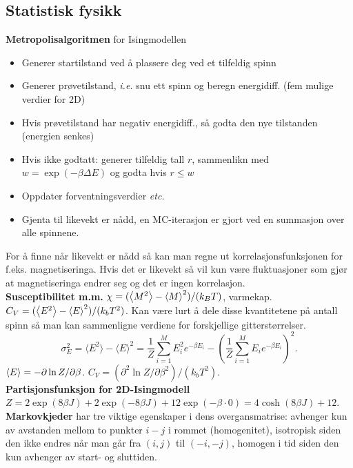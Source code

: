 \documentclass[12pt,a4paper,twocolumn]{article}
\begin{document}
\begin{flushleft}
\subsection{Statistisk fysikk} %
\label{sub:statistisk_fysikk}
\textbf{Metropolisalgoritmen} for Isingmodellen
\begin{itemize}
  \item Generer startilstand ved å plassere deg ved et tilfeldig spinn
  \item Generer prøvetilstand, \emph{i.e.} snu ett spinn og beregn energidiff. (fem mulige verdier for 2D)
  \item Hvis prøvetilstand har negativ energidiff., så godta den nye tilstanden (energien senkes)
  \item Hvis ikke godtatt: generer tilfeldig tall $r$, sammenlikn med $w=\exp(-\beta\Delta E)$ og godta hvis $r\leq w$
  \item Oppdater forventningsverdier \emph{etc.}
  \item Gjenta til likevekt er nådd, en MC-iterasjon er gjort ved en summasjon over alle spinnene.
\end{itemize}
For å finne når likevekt er nådd så kan man regne ut korrelasjonsfunksjonen for f.eks. magnetiseringa. Hvis det er likevekt så vil kun være fluktuasjoner som gjør at magnetiseringa endrer seg og det er ingen korrelasjon.\\
\textbf{Susceptibilitet m.m.} $\chi = (\left< M^2 \right> - \left< M \right>^2)/(k_B T)$, varmekap. $C_V = (\left< E^2 \right> - \left< E \right>^2)/(k_b T^2)$. Kan være lurt å dele disse kvantitetene på antall spinn så man kan sammenligne verdiene for forskjellige gitterstørrelser.
\begin{equation*}
\sigma_E^2=\langle E^2 \rangle-\langle E \rangle^2=
         \frac{1}{Z}\sum_{i=1}^M E_i^2e^{-\beta E_i}-
          \left(\frac{1}{Z}\sum_{i=1}^M E_ie^{-\beta E_i}\right)^2.
\end{equation*}
$\left< E \right> = -\partial \ln Z /\partial \beta$. $C_V = (\partial^2 \ln Z/\partial\beta^2)/(k_b T^2)$.\\
\textbf{Partisjonsfunksjon for 2D-Isingmodell} $Z = 2\exp(8\beta J) + 2\exp(-8\beta J) + 12\exp(-\beta\cdot0) = 4\cosh(8\beta J) + 12$.\\
\textbf{Markovkjeder} har tre viktige egenskaper i dens overgansmatrise: avhenger kun av avstanden mellom to punkter $i-j$ i rommet (homogenitet), isotropisk siden den ikke endres når man går fra $(i,j)$ til $(-i,-j)$, homogen i tid siden den kun avhenger av start- og sluttiden.\\

\end{flushleft}
\end{document}
